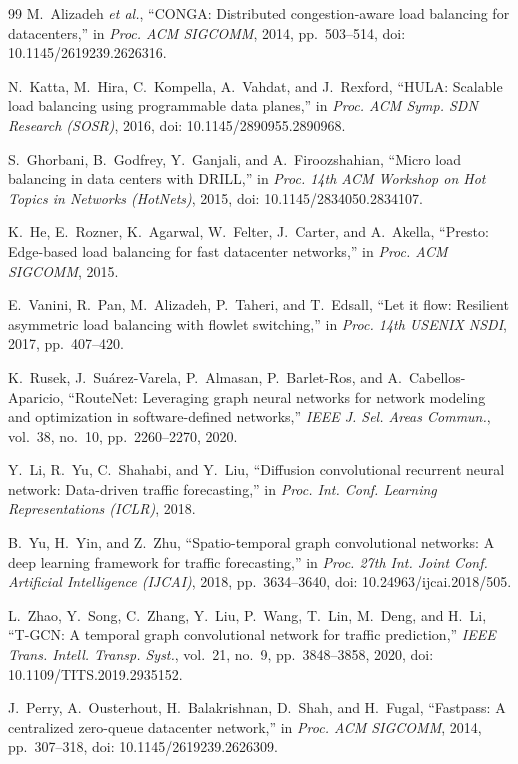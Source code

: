 \documentclass[conference]{IEEEtran}
\begin{document}
\begin{thebibliography}{99}
M.~Alizadeh \emph{et al.}, ``CONGA: Distributed congestion-aware load balancing for datacenters,'' in \emph{Proc. ACM SIGCOMM}, 2014, pp.~503--514, doi: 10.1145/2619239.2626316.

N.~Katta, M.~Hira, C.~Kompella, A.~Vahdat, and J.~Rexford, ``HULA: Scalable load balancing using programmable data planes,'' in \emph{Proc. ACM Symp. SDN Research (SOSR)}, 2016, doi: 10.1145/2890955.2890968.

S.~Ghorbani, B.~Godfrey, Y.~Ganjali, and A.~Firoozshahian, ``Micro load balancing in data centers with DRILL,'' in \emph{Proc. 14th ACM Workshop on Hot Topics in Networks (HotNets)}, 2015, doi: 10.1145/2834050.2834107.

K.~He, E.~Rozner, K.~Agarwal, W.~Felter, J.~Carter, and A.~Akella, ``Presto: Edge-based load balancing for fast datacenter networks,'' in \emph{Proc. ACM SIGCOMM}, 2015.

E.~Vanini, R.~Pan, M.~Alizadeh, P.~Taheri, and T.~Edsall, ``Let it flow: Resilient asymmetric load balancing with flowlet switching,'' in \emph{Proc. 14th USENIX NSDI}, 2017, pp.~407--420.

K.~Rusek, J.~Su{\'a}rez-Varela, P.~Almasan, P.~Barlet-Ros, and A.~Cabellos-Aparicio, ``RouteNet: Leveraging graph neural networks for network modeling and optimization in software-defined networks,'' \emph{IEEE J. Sel. Areas Commun.}, vol.~38, no.~10, pp.~2260--2270, 2020.

Y.~Li, R.~Yu, C.~Shahabi, and Y.~Liu, ``Diffusion convolutional recurrent neural network: Data-driven traffic forecasting,'' in \emph{Proc. Int. Conf. Learning Representations (ICLR)}, 2018.

B.~Yu, H.~Yin, and Z.~Zhu, ``Spatio-temporal graph convolutional networks: A deep learning framework for traffic forecasting,'' in \emph{Proc. 27th Int. Joint Conf. Artificial Intelligence (IJCAI)}, 2018, pp.~3634--3640, doi: 10.24963/ijcai.2018/505.

L.~Zhao, Y.~Song, C.~Zhang, Y.~Liu, P.~Wang, T.~Lin, M.~Deng, and H.~Li, ``T-GCN: A temporal graph convolutional network for traffic prediction,'' \emph{IEEE Trans. Intell. Transp. Syst.}, vol.~21, no.~9, pp.~3848--3858, 2020, doi: 10.1109/TITS.2019.2935152.

J.~Perry, A.~Ousterhout, H.~Balakrishnan, D.~Shah, and H.~Fugal, ``Fastpass: A centralized zero-queue datacenter network,'' in \emph{Proc. ACM SIGCOMM}, 2014, pp.~307--318, doi: 10.1145/2619239.2626309.


\end{thebibliography}
\end{document}
